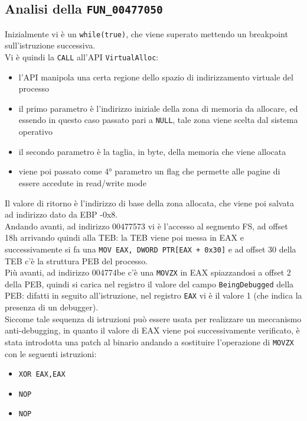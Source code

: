 \documentclass[12pt]{extarticle}
\begin{document}
\subsection{Analisi della \texttt{FUN\_00477050}}
Inizialmente vi è un \texttt{while(true)}, che viene superato mettendo un breakpoint sull'istruzione successiva.\\Vi è quindi la \texttt{CALL} all'API \texttt{VirtualAlloc}:
\begin{itemize}
    \item l'API manipola una certa regione dello spazio di indirizzamento virtuale del processo
    \item il primo parametro è l'indirizzo iniziale della zona di memoria da allocare, ed essendo in questo caso passato pari a \texttt{NULL}, tale zona viene scelta dal sistema operativo
    \item il secondo parametro è la taglia, in byte, della memoria che viene allocata
    \item viene poi passato come 4° parametro un flag che permette alle pagine di essere accedute in read/write mode
\end{itemize}
Il valore di ritorno è l'indirizzo di base della zona allocata, che viene poi salvata ad indirizzo dato da EBP -0x8.\\Andando avanti, ad indirizzo 00477573 vi è l'accesso al segmento FS, ad offset 18h arrivando quindi alla TEB: la TEB viene poi messa in EAX e successivamente si fa una \texttt{MOV EAX, DWORD PTR[EAX + 0x30]} e ad offset 30 della TEB c'è la struttura PEB del processo.\\Più avanti, ad indirizzo 004774be c'è una \texttt{MOVZX} in EAX spiazzandosi a offset 2 della PEB, quindi si carica nel registro il valore del campo \texttt{BeingDebugged} della PEB: difatti in seguito all'istruzione, nel registro \texttt{EAX} vi è il valore 1 (che indica la presenza di un debugger).\\Siccome tale sequenza di istruzioni può essere usata per realizzare un meccanismo anti-debugging, in quanto il valore di EAX viene poi successivamente verificato, è stata introdotta una patch al binario andando a sostituire l'operazione di \texttt{MOVZX} con le seguenti istruzioni:
\begin{itemize}
    \item \texttt{XOR EAX,EAX}
    \item \texttt{NOP}
    \item \texttt{NOP}
\end{itemize}
\end{document}
